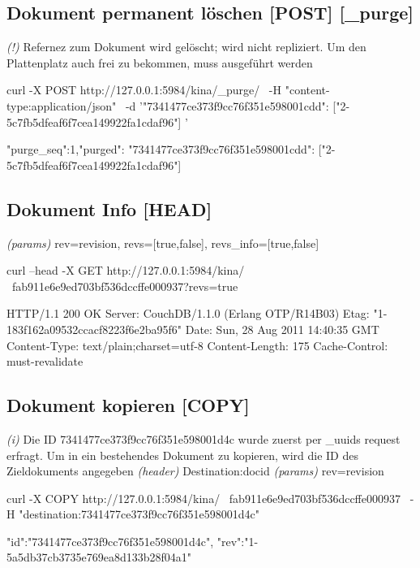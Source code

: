 \documentclass[19pt,landscape,twocolumn]{article}
\newcommand{\mono}[1]{\texttt{\textendash\textendash {#1}}}
\newcommand{\htmlverb}[1]{{[}\textbf{{#1}}{]}}
\newcommand{\brackets}[1]{{[}{#1}{]}}
\newcommand{\setparskip}{\setlength{\parskip}{-6mm}}
\newcommand{\resetparskip}{\setlength{\parskip}{1mm}}
\begin{document}
\subsection{Dokument permanent löschen \htmlverb{POST} \htmlverb{\_purge}}
\emph{(!)} Refernez zum Dokument wird gelöscht; wird nicht repliziert. Um den\newline
Plattenplatz auch frei zu bekommen, muss \mono{\_compact} ausgeführt werden

\begin{code}
curl -X POST http://127.0.0.1:5984/kina/_purge/ \
  -H "content-type:application/json" \
  -d '{"7341477ce373f9cc76f351e598001cdd":
        ["2-5c7fb5dfeaf6f7cea149922fa1cdaf96"]
     }'
\end{code}
\setparskip
\begin{response}
{"purge_seq":1,"purged":{
  "7341477ce373f9cc76f351e598001cdd":
    ["2-5c7fb5dfeaf6f7cea149922fa1cdaf96"]
  }
}
\end{response}
\resetparskip

\subsection{Dokument Info \htmlverb{HEAD}}
\emph{(params)} rev=revision, revs=\brackets{true,false}, revs\_info=\brackets{true,false}

\begin{code}
curl --head -X GET http://127.0.0.1:5984/kina/ \
  fab911e6e9ed703bf536dccffe000937?revs=true
\end{code}
\setparskip
\begin{response}
HTTP/1.1 200 OK
Server: CouchDB/1.1.0 (Erlang OTP/R14B03)
Etag: "1-183f162a09532ccacf8223f6e2ba95f6"
Date: Sun, 28 Aug 2011 14:40:35 GMT
Content-Type: text/plain;charset=utf-8
Content-Length: 175
Cache-Control: must-revalidate
\end{response}
\resetparskip

\subsection{Dokument kopieren \htmlverb{COPY}}
\emph{(i)} Die ID 7341477ce373f9cc76f351e598001d4c wurde zuerst per \_uuids request \newline
erfragt. Um in ein bestehendes Dokument zu kopieren, wird die ID des Zieldokuments angegeben
\emph{(header)} Destination:docid \newline
\emph{(params)} rev=revision

\begin{code}
curl -X COPY http://127.0.0.1:5984/kina/ \
  fab911e6e9ed703bf536dccffe000937 \
  -H "destination:7341477ce373f9cc76f351e598001d4c"
\end{code}
\setparskip
\begin{response}
{"id":"7341477ce373f9cc76f351e598001d4c",
 "rev":"1-5a5db37cb3735e769ea8d133b28f04a1"}
\end{response}
\resetparskip
\end{document}
